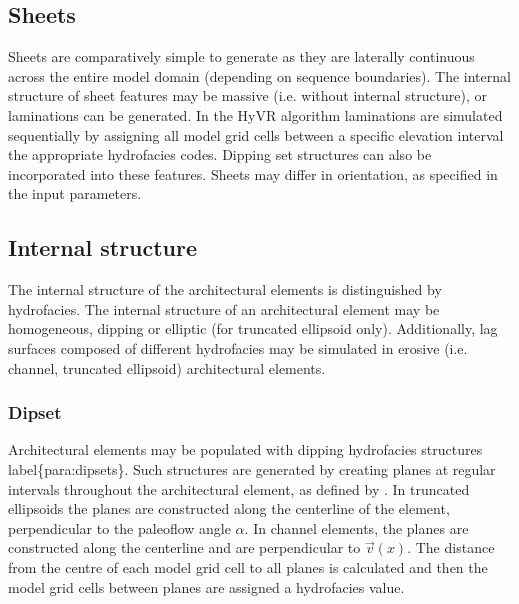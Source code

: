\documentclass[letterpaper,10pt,english]{sphinxmanual}
\begin{document}
\subsection{Sheets}
\label{methods:sheets}
Sheets are comparatively simple to generate as they are laterally continuous across the entire model domain (depending on sequence boundaries). The internal structure of sheet features may be massive (i.e. without internal structure), or laminations can be generated.  In the HyVR algorithm laminations are simulated sequentially by assigning all model grid cells between a specific elevation interval the appropriate hydrofacies codes. Dipping set structures can also be incorporated into these features. Sheets may differ in orientation, as specified in the input parameters.


\subsection{Internal structure}
\label{methods:internal-structure}
The internal structure of the architectural elements is distinguished by hydrofacies. The internal structure of an architectural element may be homogeneous, dipping or elliptic (for truncated ellipsoid only). Additionally, lag surfaces composed of different hydrofacies may be simulated in erosive (i.e. channel, truncated ellipsoid) architectural elements.


\subsubsection{Dipset}
\label{methods:id8}\label{methods:id9}
Architectural elements may be populated with dipping hydrofacies structures label\{para:dipsets\}. Such structures are generated by creating planes at regular intervals throughout the architectural element, as defined by . In truncated ellipsoids the planes are constructed along the centerline of the element, perpendicular to the paleoflow angle \(\alpha\). In channel elements, the planes are constructed along the centerline and are perpendicular to \(\vec{v}(x)\). The distance from the centre of each model grid cell to all planes is calculated and then the model grid cells between planes are assigned a hydrofacies value.
\end{document}
